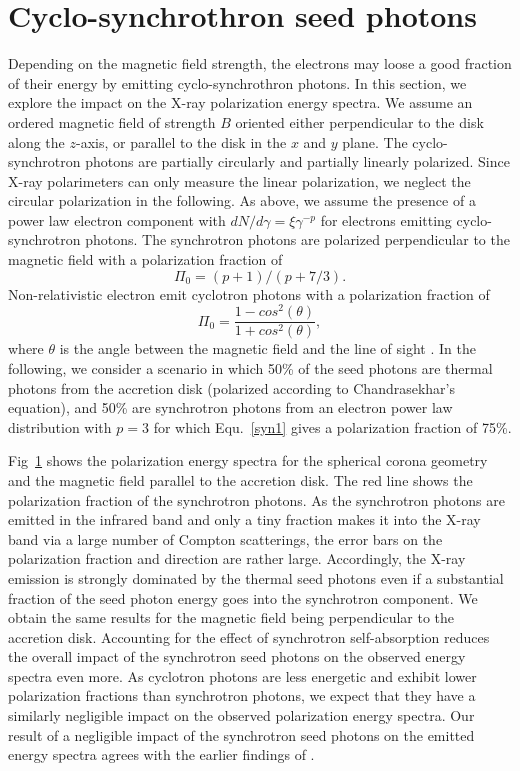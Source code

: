 \documentclass[manuscript]{aastex}
\begin{document}
\section{Cyclo-synchrothron seed photons }\label{seed}
Depending on the magnetic field strength, the electrons may loose a good fraction of their energy by emitting 
cyclo-synchrothron photons. In this section, we explore the impact on the X-ray polarization energy spectra. 
We assume an ordered magnetic field of strength $B$ oriented either perpendicular to the disk along the $z$-axis, 
or parallel to the disk in the $x$ and $y$ plane. The cyclo-synchrotron photons are partially circularly and partially
linearly polarized. Since X-ray polarimeters can only measure the linear polarization, we neglect the circular polarization
in the following. As above, we assume the presence of a power law electron component with 
$dN/d\gamma=\xi\gamma^{-p}$ for electrons emitting cyclo-synchrotron photons. 
The synchrotron photons are polarized perpendicular to the magnetic field with a polarization fraction of \citep{ryb79}
\begin{equation}\label{syn1}
\Pi_0=(p+1)/(p+7/3).
\end{equation}
Non-relativistic electron emit cyclotron photons with a polarization fraction of 
\begin{equation}
\Pi_0=\frac{1-cos^2(\theta)}{1+cos^2(\theta)},
\end{equation}
where $\theta$ is the angle between the magnetic field and the line of sight \citep{ryb79}. 
In the following, we consider a scenario in which 50\% of the seed photons are thermal photons from the accretion disk
(polarized according to Chandrasekhar's equation), and 50\% are synchrotron photons from an electron power law distribution with $p=3$ for which Equ.~\ref{syn1} gives a polarization fraction of 75\%. 

Fig~\ref{seed} shows the polarization energy spectra for the spherical corona geometry and the magnetic field 
parallel to the accretion disk. The red line shows the polarization fraction of the synchrotron photons. 
As the synchrotron photons are emitted in the infrared band and only a tiny fraction makes it into the 
X-ray band via a large number of Compton scatterings, the error bars on the polarization fraction and direction
are rather large. Accordingly, the X-ray emission is strongly dominated by the thermal seed photons even
if a substantial fraction of the seed photon energy goes into the synchrotron component.
We obtain the same results for the magnetic field being perpendicular to the accretion disk.
Accounting for the effect of synchrotron self-absorption reduces the overall impact of the synchrotron seed
photons on the observed energy spectra even more.
As cyclotron photons are less energetic and exhibit lower polarization fractions than synchrotron photons, 
we expect that they have a similarly negligible impact on the observed polarization energy spectra. Our result of a negligible impact of the synchrotron seed photons on the emitted energy spectra agrees with the earlier findings of \citep{sch13}.
%
\end{document}
